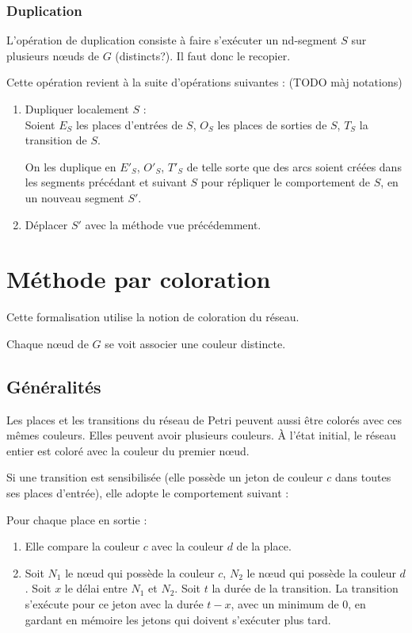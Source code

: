 \subsubsection{Duplication}
L'opération de duplication consiste à faire s'exécuter un nd-segment $S$ sur plusieurs nœuds de $G$ (distincts?). Il faut donc le recopier.

Cette opération revient à la suite d'opérations suivantes : 
(TODO màj notations)
\begin{enumerate}
\item Dupliquer localement $S$ : \\
		Soient $E_S$ les places d'entrées de $S$, $O_S$ les places de sorties de $S$, $T_S$ la transition de $S$.
		
		On les duplique en $E'_S$, $O'_S$, $T'_S$ de telle sorte que des arcs soient créées dans les segments précédant et suivant $S$ pour répliquer le comportement de $S$, en un nouveau segment $S'$.
\item Déplacer $S'$ avec la méthode vue précédemment.
\end{enumerate}



\section{Méthode par coloration}
Cette formalisation utilise la notion de coloration du réseau.

Chaque nœud de $G$ se voit associer une couleur distincte.

\subsection{Généralités}
Les places et les transitions du réseau de Petri peuvent aussi être colorés avec ces mêmes couleurs. Elles peuvent avoir plusieurs couleurs.
À l'état initial, le réseau entier est coloré avec la couleur du premier nœud.

Si une transition est sensibilisée (elle possède un jeton de couleur $c$ dans toutes ses places d'entrée), elle adopte le comportement suivant : 

Pour chaque place en sortie :
\begin{enumerate}
\item Elle compare la couleur $c$ avec la couleur $d$ de la place. 
\item Soit $N_1$ le nœud qui possède la couleur $c$, $N_2$ le nœud qui possède la couleur $d$. Soit $x$ le délai entre $N_1$ et $N_2$. Soit $t$ la durée de la transition. La transition s'exécute pour ce jeton avec la durée $t - x$, avec un minimum de 0, en gardant en mémoire les jetons qui doivent s'exécuter plus tard.
\end{enumerate}

